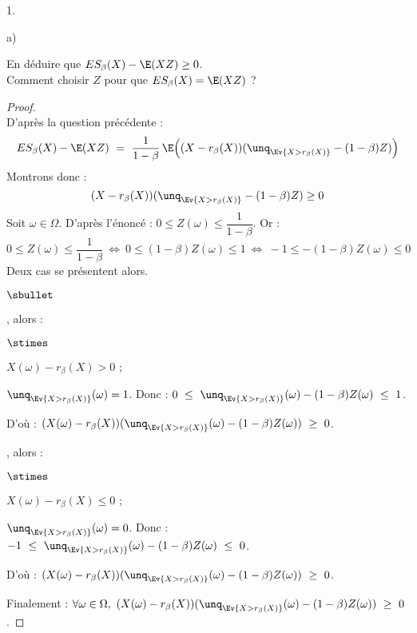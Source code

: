 \begin{noliste}{1.}
\begin{noliste}{a)}
    
    \item En déduire que $ES_\beta(X)-\E(XZ) \geq 0$.\\
    Comment choisir $Z$ pour que $ES_\beta(X)=\E(XZ)$ ?
    
    \begin{proof}~\\
      D'après la question précédente :
      \[
        ES_\beta(X) - \E(XZ) \ = \ \dfrac{1}{1-\beta} \, 
	\E\Big( (X- r_\beta(X)) (\unq_{\Ev{X > r_\beta(X)}} - 
	(1-\beta) Z )\Big)
      \]
      Montrons donc :
      \[
        (X- r_\beta(X)) (\unq_{\Ev{X > r_\beta(X)}} - 
	(1-\beta) Z ) \geq 0
      \]
      Soit $\omega \in \Omega$. D'après l'énoncé : $0 \leq Z(\omega) 
      \leq \dfrac{1}{1-\beta}$. Or :
      \[
        0 \leq Z(\omega) \leq \dfrac{1}{1-\beta} \ \Leftrightarrow \
        0 \leq (1-\beta)Z(\omega) \leq 1 \ \Leftrightarrow \ 
        -1 \leq -(1-\beta)Z(\omega) \leq 0
      \]
      Deux cas se présentent alors.
      \begin{noliste}{$\sbullet$}
	\item {}, alors :
	\begin{noliste}{$\stimes$}
	  \item $X(\omega) - r_\beta(X) > 0$ ;
	  \item $\unq_{\Ev{X >r_\beta(X)}}(\omega) =1$. Donc :
	  $0 \ \leq \ \unq_{\Ev{X > r_\beta(X)}}(\omega) - (1-\beta)Z 
	  (\omega) \ \leq \ 1$.
	\end{noliste}
	D'où : $(X(\omega) - r_\beta(X))(\unq_{\Ev{ X > r_\beta(X)}}
	(\omega) - (1-\beta) Z(\omega)) \ \geq \ 0$.
	
	\item {}, alors :
	\begin{noliste}{$\stimes$}
	  \item $X(\omega) - r_\beta(X) \leq 0$ ;
	  \item $\unq_{\Ev{X >r_\beta(X)}}(\omega) =0$. Donc :
	  $-1 \ \leq \ \unq_{\Ev{X > r_\beta(X)}}(\omega) - (1-\beta)Z 
	  (\omega) \ \leq \ 0$.
	\end{noliste}
	D'où : $(X(\omega) - r_\beta(X))(\unq_{\Ev{ X > r_\beta(X)}}
	(\omega) - (1-\beta) Z(\omega)) \ \geq \ 0$.
      \end{noliste}
      Finalement : $\forall \omega \in \Omega, \ 
      (X(\omega) - r_\beta(X))(\unq_{\Ev{ X > r_\beta(X)}}
      (\omega) - (1-\beta) Z(\omega)) \ \geq \ 0$.
      \conc{$(X - r_\beta(X))(\unq_{\Ev{ X > r_\beta(X)}}
      - (1-\beta) Z) \ \geq \ 0$}
      

\end{proof}
\end{noliste}
\end{noliste}

